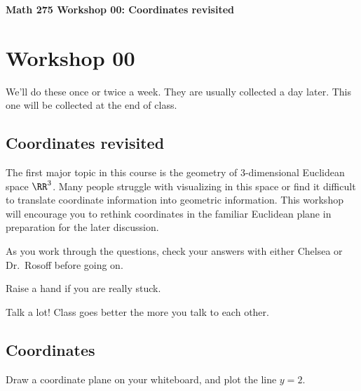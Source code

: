\documentclass[12pt]{exam}
\begin{document}
\noindent
\textbf{{\large Math 275 \hfill Workshop 00: Coordinates revisited}}

\noindent
{}

\noindent
{} 

\section{Workshop 00}

We'll do these once or twice a week. They are usually collected a
day later. This one will be collected at the end of class.

\subsection{Coordinates revisited}

The first major topic in this course is the geometry of 3-dimensional
Euclidean space $\RR^3$. Many people struggle with visualizing in
this space or find it difficult to translate coordinate information into
geometric information. This workshop will encourage you to rethink
coordinates in the familiar Euclidean plane in preparation for the later
discussion.

\begin{compactitem}
    \item As you work through the questions, check your answers with either Chelsea or Dr.\ Rosoff before going on. 
    \item Raise a hand if you are really stuck. 
    \item Talk a lot! Class goes better the more you talk to each other.
\end{compactitem}

\subsection{Coordinates}

Draw a coordinate plane on your whiteboard, and plot the line $y = 2$.
\end{document}
